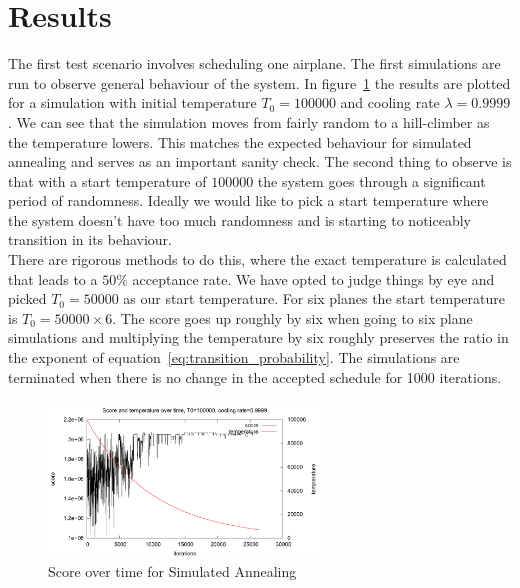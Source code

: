 \documentclass[journal]{IEEEtran}
\begin{document}
\section{Results}
The first test scenario involves scheduling one airplane. The first simulations are run to observe general behaviour of the system. In figure~\ref{fig:simulated_annealing_score} the results are plotted for a simulation with initial temperature $T_0=\num{100000}$ and cooling rate $\lambda=0.9999$. We can see that the simulation moves from fairly random to a hill-climber as the temperature lowers. This matches the expected behaviour for simulated annealing and serves as an important sanity check. The second thing to observe is that with a start temperature of $\num{100000}$ the system goes through a significant period of randomness. Ideally we would like to pick a start temperature where the system doesn't have too much randomness and is starting to noticeably transition in its behaviour.\\
There are rigorous methods to do this, where the exact temperature is calculated that leads to a $50\%$ acceptance rate. We have opted to judge things by eye and picked $T_0=\num{50000}$ as our start temperature. For six planes the start temperature is $T_0=\num{50000} \times 6$. The score goes up roughly by six when going to six plane simulations and multiplying the temperature by six roughly preserves the ratio in the exponent of equation~\ref{eq:transition_probability}. The simulations are terminated when there is no change in the accepted schedule for 1000 iterations. \\
\begin{figure}[H]
\centering
\includegraphics[width=2.9in]{score_over_time}
\caption{Score over time for Simulated Annealing}
\label{fig:simulated_annealing_score}
\end{figure}
\end{document}
